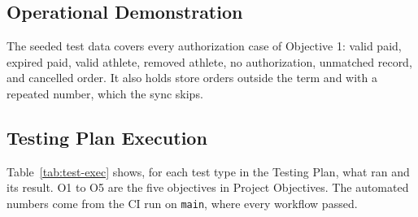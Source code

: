 \subsection{Operational Demonstration}
The seeded test data covers every authorization case of Objective 1: valid paid, expired paid, valid athlete, removed athlete, no authorization, unmatched record, and cancelled order. It also holds store orders outside the term and with a repeated number, which the sync skips.



\subsection{Testing Plan Execution}
Table~\ref{tab:test-exec} shows, for each test type in the Testing Plan, what ran and its result. O1 to O5 are the five objectives in Project Objectives. The automated numbers come from the CI run on \texttt{main}, where every workflow passed.

